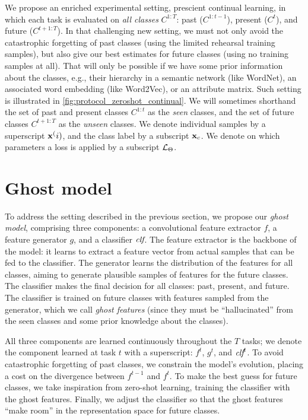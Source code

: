 We propose an enriched experimental setting, prescient continual learning, in which each task is
evaluated on \textit{all classes} $C^{1:T}$: past ($C^{1:t-1}$), present ($C^t$), and future
($C^{t+1:T}$). In that challenging new setting, we must not only avoid the catastrophic forgetting
of past classes (using the limited rehearsal training samples), but also give our best estimates for
future classes (using no training samples at all). That will only be possible if we have some prior
information about the classes, e.g., their hierarchy in a semantic network (like WordNet), an
associated word embedding (like Word2Vec), or an attribute matrix. Such setting is illustrated in
\autoref{fig:protocol_zeroshot_continual}. We will sometimes shorthand the set of past and present
classes $C^{1:t}$ as the \textit{seen} classes, and the set of future classes $C^{t+1:T}$ as the
\textit{unseen} classes. We denote individual samples by a superscript $\mathbf{x}^(i)$, and the class
label by a subscript $\mathbf{x}_c$. We denote on which parameters a loss is applied by a subscript
$\mathcal{L}_\Theta$.

\section{Ghost model}
\label{sec:model}

To address the setting described in the previous section, we propose our \textit{ghost model},
comprising three components: a convolutional feature extractor $f$, a feature generator $g$, and a
classifier $\textit{clf}$. The feature extractor is the backbone of the model: it learns to extract a
feature vector from actual samples that can be fed to the classifier. The generator learns the
distribution of the features for all classes, aiming to generate plausible samples of features for
the future classes. The classifier makes the final decision for all classes: past, present, and
future. The classifier is trained on future classes with features sampled from the generator, which
we call \textit{ghost features} (since they must be “hallucinated” from the seen classes and some
prior knowledge about the classes).

All three components are learned continuously throughout the $T$ tasks; we denote the component
learned at task $t$ with a superscript: $f^t$, $g^t$, and $\textit{clf}^t$. To avoid catastrophic forgetting
of past classes, we constrain the model's evolution, placing a cost on the divergence between
$f^{t-1}$ and $f^t$. To make the best guess for future classes, we take inspiration from zero-shot
learning, training the classifier with the ghost features. Finally, we adjust the classifier so that
the ghost features “make room” in the representation space for future classes.

